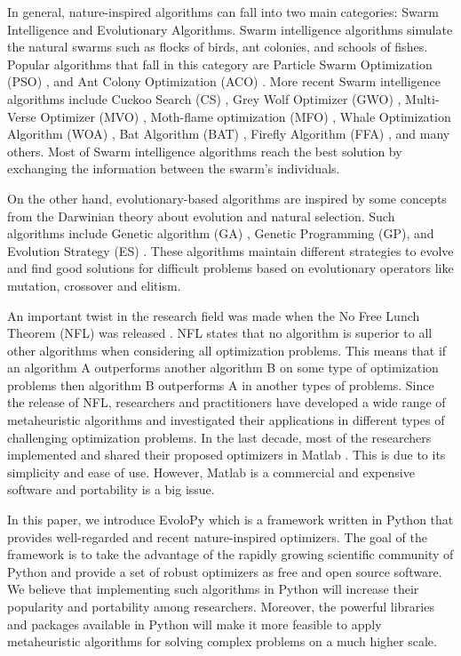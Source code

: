 \documentclass[a4paper,twoside]{article}
\begin{document}
In general, nature-inspired algorithms can fall into two main categories: Swarm Intelligence and Evolutionary Algorithms. Swarm intelligence algorithms simulate the natural swarms such as flocks of birds, ant colonies, and schools of fishes. Popular algorithms that fall in this category are Particle Swarm Optimization (PSO) \cite{Kennedy95}, and Ant Colony Optimization (ACO) \cite{Koro_ec_2009}. More recent Swarm intelligence algorithms include Cuckoo Search (CS) \cite{Yang2009}, Grey Wolf Optimizer (GWO) \cite{Mirjalili201446}, Multi-Verse Optimizer (MVO) \cite{Mirjalili2016}, Moth-flame optimization (MFO) \cite{Mirjalili2015228}, Whale Optimization Algorithm (WOA) \cite{Mirjalili201651}, Bat Algorithm (BAT) \cite{Yang2010}, Firefly Algorithm (FFA) \cite{Yang2010FFA}, and many others. Most of Swarm intelligence algorithms reach the best solution by exchanging the information between the swarm's individuals. 

On the other hand, evolutionary-based algorithms are inspired by some concepts from the Darwinian theory about evolution and natural selection. Such algorithms include Genetic algorithm (GA) \cite{Holland92}, Genetic Programming (GP)\cite{Koza1992}, and Evolution Strategy (ES) \cite{Beyer2002}. These algorithms maintain different strategies to evolve and find good solutions for difficult problems based on evolutionary operators like mutation, crossover and elitism. 

An important twist in the research field was made when the No Free Lunch Theorem (NFL) was released \cite{wolpert1997no,ho2002simple}. NFL states that no algorithm is superior to all other algorithms when considering all optimization problems. This means that if an algorithm A outperforms another algorithm B on some type of optimization problems then algorithm B outperforms A in another types of problems. Since the release of NFL, researchers and practitioners have developed a wide range of metaheuristic algorithms and investigated their applications in different types of challenging optimization problems. In the last decade, most of the researchers implemented and shared their proposed optimizers in Matlab \cite{Yang2010FFA,Yang2010,Mirjalili201446,Mirjalili2015228}. This is due to its simplicity and ease of use. However, Matlab is a commercial and expensive software and portability is a big issue.

In this paper, we introduce EvoloPy which is a framework written in Python that provides well-regarded and recent nature-inspired optimizers. The goal of the framework is to take the advantage of the rapidly growing scientific community of Python and provide a set of robust optimizers as free and open source software. We believe that implementing such algorithms in Python will increase their popularity and portability among researchers. Moreover, the powerful libraries and packages available in Python will make it more feasible to apply metaheuristic algorithms for solving complex problems on a much higher scale.
\end{document}
